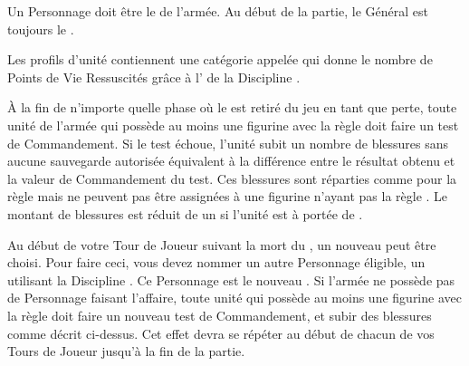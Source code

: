 \newcommand{\greatmonstrousrevenantrule}{\newrule{%
Le \monstrousrevenant{} gagne \thunderouscharge{} et sa taille de socle change en \unit{60x100}{\milli\meter}.
}}

\newcommand{\colossalzombiedragonrule}{%
La figurine gagne +1 en Capacité de Combat, la valeur de sa \innatedefence{} passe à ($ 3+ $), et sa taille de socle change en \unit{100x150}{\milli\meter}.
}







\startarmywiderules

\armywideruleentry{\masterofundeath}

Un Personnage doit être le \textbf{\master{}} de l'armée. Au début de la partie, le Général est toujours le \master{}.


\armywideruleentry{\invocation}

Les profils d'unité contiennent une catégorie appelée \invocation{} qui donne le nombre de Points de Vie Ressuscités grâce à l'\necromancysignaturespell{} de la Discipline \necromancy{}.

\closearmywiderules

\vspace*{1.5cm}
\startarmyspecialrules

\armyspecialruleentry{\ashestoashes}

À la fin de n'importe quelle phase où le \master{} est retiré du jeu en tant que perte, toute unité de l'armée qui possède au moins une figurine avec la règle \ashestoashes{} doit faire un test de Commandement. Si le test échoue, l'unité subit un nombre de blessures sans aucune sauvegarde autorisée équivalent à la différence entre le résultat obtenu et la valeur de Commandement du test. Ces blessures sont réparties comme pour la règle \unstable{} mais ne peuvent pas être assignées à une figurine n'ayant pas la règle \ashestoashes{}. Le montant de blessures est réduit de un si l'unité est à portée de \holdyourground{}.

Au début de votre Tour de Joueur suivant la mort du \master{}, un nouveau \master{} peut être choisi. Pour faire ceci, vous devez nommer un autre Personnage éligible, un \wizard{} utilisant la Discipline \necromancy{}. Ce Personnage est le nouveau \master{}. Si l'armée ne possède pas de Personnage faisant l'affaire, toute unité qui possède au moins une figurine avec la règle \ashestoashes{} doit faire un nouveau test de Commandement, et subir des blessures comme décrit ci-dessus. Cet effet devra se répéter au début de chacun de vos Tours de Joueur jusqu'à la fin de la partie.

